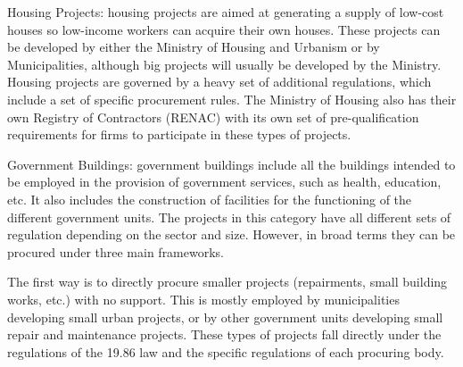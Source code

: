 Housing Projects: housing projects are aimed at generating a supply of low-cost houses so low-income workers can acquire their own houses. These projects can be developed by either the Ministry of Housing and Urbanism or by Municipalities, although big projects will usually be developed by the Ministry. Housing projects are governed by a heavy set of additional regulations, which include a set of specific procurement rules. The Ministry of Housing also has their own Registry of Contractors (RENAC) with its own set of pre-qualification requirements for firms to participate in these types of projects.

Government Buildings: government buildings include all the buildings intended to be employed in the provision of government services, such as health, education, etc. It also includes the construction of facilities for the functioning of the different government units. The projects in this category have all different sets of regulation depending on the sector and size. However, in broad terms they can be procured under three main frameworks.

The first way is to directly procure smaller projects (repairments, small building works, etc.) with no support. This is mostly employed by municipalities developing small urban projects, or by other government units developing small repair and maintenance projects. These types of projects fall directly under the regulations of the 19.86 law and the specific regulations of each procuring body.

